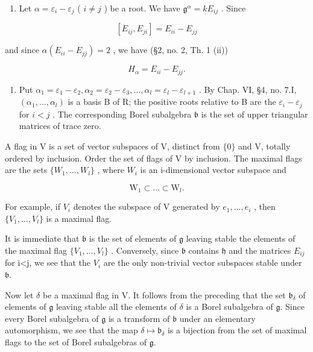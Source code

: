\begin{enumerate}
\def\labelenumi{(\Roman{enumi})}
\setcounter{enumi}{1}
\tightlist
\item
  Let \(\alpha = \varepsilon_{i} - \varepsilon_{j}\) ( \(i \neq j\) ) be a root. We have \(\mathfrak{g}^{\alpha} = kE_{ij}\) . Since
\end{enumerate}

\[
[ E _ {i j}, E _ {j i} ] = E _ {i i} - E _ {j j}
\]

and since \(\alpha(E_{ii} - E_{jj}) = 2\) , we have (§2, no. 2, Th. 1 (ii))

\[
H _ {\alpha} = E _ {i i} - E _ {j j}.
\]

\begin{enumerate}
\def\labelenumi{(\Roman{enumi})}
\setcounter{enumi}{2}
\tightlist
\item
  Put \(\alpha_{1} = \varepsilon_{1} - \varepsilon_{2},\alpha_{2} = \varepsilon_{2} - \varepsilon_{3},\ldots ,\alpha_{l} = \varepsilon_{l} - \varepsilon_{l + 1}\) . By Chap. VI, §4, no. 7.I, \((\alpha_{1},\dots,\alpha_{l})\) is a basis B of R; the positive roots relative to B are the \(\varepsilon_i - \varepsilon_j\) for \(i < j\) . The corresponding Borel subalgebra \(\mathfrak{b}\) is the set of upper triangular matrices of trace zero.
\end{enumerate}

A flag in V is a set of vector subspaces of V, distinct from \(\{0\}\) and V, totally ordered by inclusion. Order the set of flags of V by inclusion. The maximal flags are the sets \(\{W_{1},\ldots,W_{l}\}\) , where \(W_{i}\) is an i-dimensional vector subspace and

\[
\mathrm{W} _ {1} \subset \dots \subset \mathrm{W} _ {l}.
\]

For example, if \(V_{i}\) denotes the subspace of V generated by \(e_{1},\ldots,e_{i}\) , then \(\{V_{1},\ldots,V_{l}\}\) is a maximal flag.

It is immediate that \(\mathfrak{b}\) is the set of elements of \(\mathfrak{g}\) leaving stable the elements of the maximal flag \(\{V_{1},\ldots,V_{l}\}\) . Conversely, since \(\mathfrak{b}\) contains \(\mathfrak{h}\) and the matrices \(E_{ij}\) for i\textless j, we see that the \(V_{i}\) are the only non-trivial vector subspaces stable under \(\mathfrak{b}\).

Now let \(\delta\) be a maximal flag in V. It follows from the preceding that the set \(\mathfrak{b}_{\delta}\) of elements of \(\mathfrak{g}\) leaving stable all the elements of \(\delta\) is a Borel subalgebra of \(\mathfrak{g}\). Since every Borel subalgebra of \(\mathfrak{g}\) is a transform of \(\mathfrak{b}\) under an elementary automorphism, we see that the map \(\delta \mapsto \mathfrak{b}_{\delta}\) is a bijection from the set of maximal flags to the set of Borel subalgebras of \(\mathfrak{g}\).

